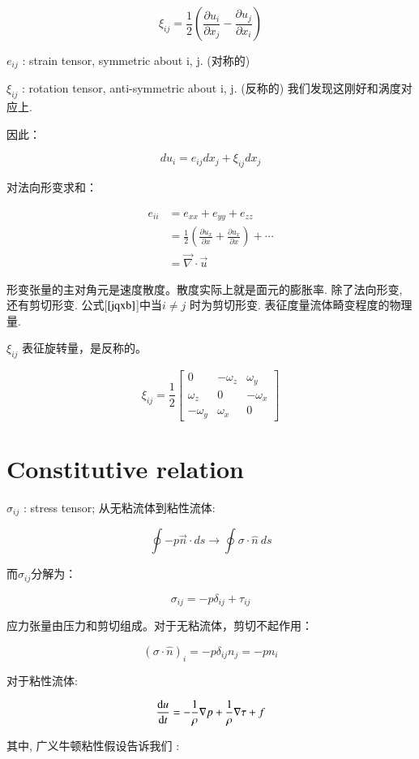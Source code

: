 \documentclass[fontset=windows]{report}
\begin{document}
\[\xi_{ij}=\frac{1}{2}\left(\frac{\partial u_i}{\partial x_j}-\frac{\partial u_j}{\partial x_i}\right)\]

\(e_{ij}\) : strain tensor, symmetric about i, j. (对称的)

\(\xi_{ij}\) : rotation tensor, anti-symmetric about i, j. (反称的)
我们发现这刚好和涡度对应上.

因此：

\[du_i = e_{ij}dx_j+\xi_{ij}dx_j\]

对法向形变求和：

\begin{align*}
e_{ii}
&=e_{xx}+e_{yy}+e_{zz}\\
&=\frac{1}{2}(\frac{\partial u_x}{\partial x}+\frac{\partial u_x}{\partial x})+\cdots\\
&=\vec\nabla\cdot \vec u
\end{align*}

形变张量的主对角元是速度散度。散度实际上就是面元的膨胀率. 除了法向形变,
还有剪切形变. 公式{[}\(\ref{jqxb}\){]}中当\(i\neq j\) 时为剪切形变.
表征度量流体畸变程度的物理量.

\(\xi_{ij}\) 表征旋转量，是反称的。

\[\xi_{ij}=
\frac{1}{2}
\left[
 \begin{matrix}
   0 & -\omega_z & \omega_y \\
   \omega_z & 0 & -\omega_x \\
   -\omega_y & \omega_x & 0
  \end{matrix}
  \right]\]


\section{Constitutive relation}

\(\sigma_{ij}\) : stress tensor; 从无粘流体到粘性流体:

\[\oint -p\vec n\cdot ds \longrightarrow \oint\sigma\cdot \hat n\ ds\]

而\(\sigma_{ij}\)分解为：

\[\sigma _{ij}=-p\delta_{ij}+\tau_{ij}\]

应力张量由压力和剪切组成。对于无粘流体，剪切不起作用：

\[(\sigma\cdot \hat n)_i = -p\delta_{ij}n_j=-pn_i\]

对于粘性流体:

\[\frac{{\rm d}u}{{\rm d}t}=-\frac 1 \rho \nabla p+\frac 1 \rho \nabla \tau + f\]

其中, 广义牛顿粘性假设告诉我们 :
\end{document}
